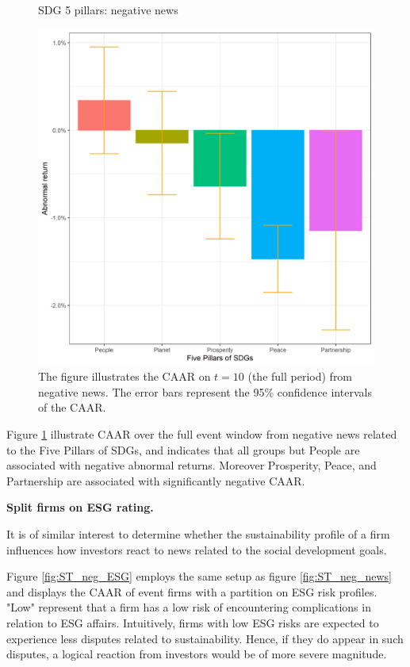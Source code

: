 \begin{figure} [H]
    \centering
    \caption{SDG 5 pillars: negative news}
    \includegraphics[scale=0.6]{Projekt/1.Figures analysis/ST_negative_sdg_bar_groups_0.png}
    \caption*{\footnotesize The figure illustrates the CAAR on $t = 10$ (the full period) from negative news. The error bars represent the 95\% confidence intervals of the CAAR.}
    \label{fig:ST_neg_bar}
\end{figure}


Figure \ref{fig:ST_neg_bar} illustrate CAAR over the full event window from negative news related to the Five Pillars of SDGs, and indicates that all groups but People are associated with negative abnormal returns. Moreover Prosperity, Peace, and Partnership are associated with significantly negative CAAR.      

\noindent \textbf{Split firms on ESG rating.} 

It is of similar interest to determine whether the sustainability profile of a firm influences how investors react to news related to the social development goals. 

Figure \ref{fig:ST_neg_ESG} employs the same setup as figure \ref{fig:ST_neg_news} and displays the CAAR of event firms with a partition on ESG risk profiles. "Low" represent that a firm has a low risk of encountering complications in relation to ESG affairs. Intuitively, firms with low ESG risks are expected to experience less disputes related to sustainability. Hence, if they do appear in such disputes, a logical reaction from investors would be of more severe magnitude. 

